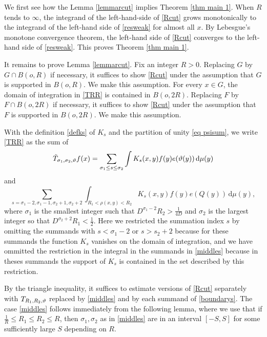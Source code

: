 We first see how the Lemma \ref{lemmarcut} implies
Theorem \ref{thm main 1}. When $R$ tends to $\infty$, the integrand of the left-hand-side of \eqref{Rcut}
grows monotonically to the integrand of the
left-hand side of \eqref{resweak} for almost all $x$.
By Lebesgue's monotone convergence theorem, the left-hand side of \eqref{Rcut} converges to the
left-hand side of \eqref{resweak}. This proves Theorem \ref{thm main 1}.

It remains to prove Lemma \ref{lemmarcut}.
Fix an integer $R>0$.  Replacing
$G$ by $G\cap B(o,R)$ if necessary, it suffices to show
\eqref{Rcut} under the assumption that $G$ is supported in $B(o,R)$. We make this assumption.
For every $x\in G$, the domain of integration
in \eqref{TRR} is contained in $B(o,2R)$.
Replacing
$F$ by $F\cap B(o,2R)$ if necessary, it suffices to show
\eqref{Rcut} under the assumption that $F$ is supported in $B(o,2R)$. We make this assumption.

With the definition \eqref{defks} of $K_s$
and the partition of unity \eqref{eq psisum}, we write \eqref{TRR} as the sum of 
\begin{equation}\label{middles}
\Tilde{T}_{\sigma_1,\sigma_2,\vartheta}f(x)=\sum_{\sigma_1 \le s\le \sigma_2}
\int K_s(x,y)  f(y) e(\vartheta(y)) \, \mathrm{d}\mu(y)
\end{equation}
and
\begin{equation}\label{boundarys}
\sum_{s=\sigma_1-2,\sigma_1-1, \sigma_2+1,\sigma_2+2}
\int_{R_1 <  \rho(x,y) < R_2}  K_s(x,y) f(y) e(Q(y)) \,
 \mathrm{d}\mu(y),
\end{equation}
where $\sigma_1$ is the smallest integer such that $D^{\sigma_1-2}R_2>\frac 1{4D}$ and $\sigma_2$
is the largest integer so that $D^{\sigma_2+2}R_1<\frac 12$. Here we restricted the summation index $s$
by omitting the summands with $s<\sigma_1-2$
or $s>s_2+2$ because for these summands the function $K_s$ vanishes on the domain of integration, and we have ommitted the restriction in the integral
in the  summands in \eqref{middles} because in theses summands the support of $K_s$ is contained in
the set described by this restriction.



By the triangle inequality, it suffices to estimate
versions of \eqref{Rcut} separately with $T_{R_1,R_2,\vartheta}$ replaced by
\eqref{middles} and by each summand of \eqref{boundarys}.
The case \eqref{middles} follows immediately from the following lemma, where we use that if
$\frac 1R\le R_1\le R_2\le R$, then $\sigma_1,\sigma_2$
as in \eqref{middles} are in an interval $[-S,S]$ for some
sufficiently large $S$ depending on $R$.

